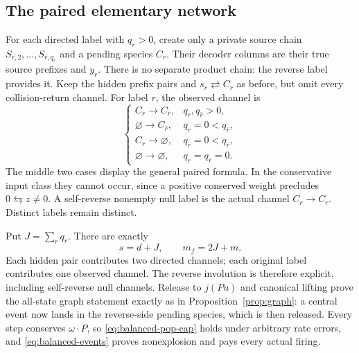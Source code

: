 \documentclass[11pt,reqno]{amsart}
\theoremstyle{definition}
\theoremstyle{remark}
\begin{document}
\subsection{The paired elementary network}
For each directed label with $q_r>0$, create only a private source chain
$S_{r,2},\ldots,S_{r,q_r}$ and a pending species $C_r$. Their decoder columns
are their true source prefixes and $y_r$. There is no separate product chain:
the reverse label provides it. Keep the hidden prefix pairs and
$s_r\rightleftarrows C_r$ as before, but omit every collision-return channel.
For label $r$, the observed channel is
\begin{equation}\label{eq:paired-central}
 \begin{cases}
 C_r\to C_{\bar r},&q_r,q_{\bar r}>0,\\
 \varnothing\to C_{\bar r},&q_r=0<q_{\bar r},\\
 C_r\to\varnothing,&q_{\bar r}=0<q_r,\\
 \varnothing\to\varnothing,&q_r=q_{\bar r}=0.
 \end{cases}
\end{equation}
The middle two cases display the general paired formula. In the conservative
input class they cannot occur, since a positive conserved weight precludes
$0\leftrightarrows z\ne0$. A self-reverse nonempty null label is the actual
channel $C_r\to C_r$. Distinct labels remain distinct.

Put $J=\sum_r q_r$. There are exactly
\begin{equation}\label{eq:balanced-size}
 s=d+J,\qquad m_f=2J+m.
\end{equation}
Each hidden pair contributes two directed channels; each original label
contributes one observed channel. The reverse involution is therefore
explicit, including self-reverse null channels. Release to $j(Pu)$ and
canonical lifting prove the all-state graph statement exactly as in
Proposition~\ref{prop:graph}: a central event now lands in the reverse-side
pending species, which is then released. Every step conserves $\omega\cdot P$,
so \eqref{eq:balanced-pop-cap} holds under arbitrary rate errors, and
\eqref{eq:balanced-events} proves nonexplosion and pays every actual firing.
\end{document}

